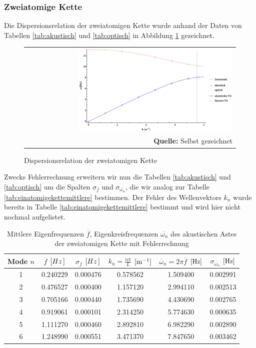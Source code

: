 \documentclass[a4paper,titlepage]{scrartcl}
\numberwithin{equation}{section}
\begin{document}
\subsubsection{Zweiatomige Kette}
Die Dispersionsrelation der zweiatomigen Kette wurde anhand der Daten von Tabellen \ref{tab:akustisch} und \ref{tab:optisch} in Abbildung \ref{fig:dispersionsrelationzweiatom} gezeichnet.
\begin{figure}[H]
	\centering
	\begin{tabular}{@{}r@{}}
		\includegraphics[width=0.75\textwidth]{dispersionsrelationzweiatom.png}\\
		\footnotesize\sffamily\textbf{Quelle:} Selbst gezeichnet
	\end{tabular}
	\caption{Dispersionsrelation der zweiatomigen Kette}
    \label{fig:dispersionsrelationzweiatom}
\end{figure}
Zwecks Fehlerrechnung erweitern wir nun die Tabellen \ref{tab:akustisch} und \ref{tab:optisch} um die Spalten $\sigma_{\overline{f}}$ und $\sigma_{\overline{\omega_n}}$, die wir analog zur Tabelle \ref{tab:einatomigekettemittlere} bestimmen. Der Fehler des Wellenvektors $k_n$ wurde bereits in Tabelle \ref{tab:einatomigekettemittlere} bestimmt und wird hier nicht nochmal aufgelistet.
\begin{table}[H]
\centering
\begin{tabular}{c|c|c|c|c|c}
Mode $n$ & $\overline{f}$ $[\unit[Hz]]$ & $\sigma_{\overline{f}}$ $[\unit[Hz]]$ & $k_n=\frac{n \pi}{L}$ $[\unit[]{m^{-1}}]$ & $\overline{\omega}_n=2 \pi \overline{f}$ $[\unit[]{Hz}]$ & $\sigma_{\overline{\omega_n}}$ $[\unit[]{Hz}]$\\
\hline
1 & 0.240229 & 0.000476 & 0.578562 & 1.509400 & 0.002991\\
2 & 0.476527 & 0.000400 & 1.157120 & 2.994110 & 0.002513\\
3 & 0.705166 & 0.000440 & 1.735690 & 4.430690 & 0.002765\\
4 & 0.919061 & 0.000101 & 2.314250 & 5.774630 & 0.000635\\
5 & 1.111270 & 0.000460 & 2.892810 & 6.982290 & 0.002890\\
6 & 1.248990 & 0.000551 & 3.471370 & 7.847650 & 0.003462
\end{tabular}
\caption{Mittlere Eigenfrequenzen $\overline{f}$, Eigenkreisfrequenzen $\overline{\omega_n}$ des akustischen Astes der zweiatomigen Kette mit Fehlerrechnung}
\label{tab:zweiatomigakustisch}
\end{table}
\end{document}
